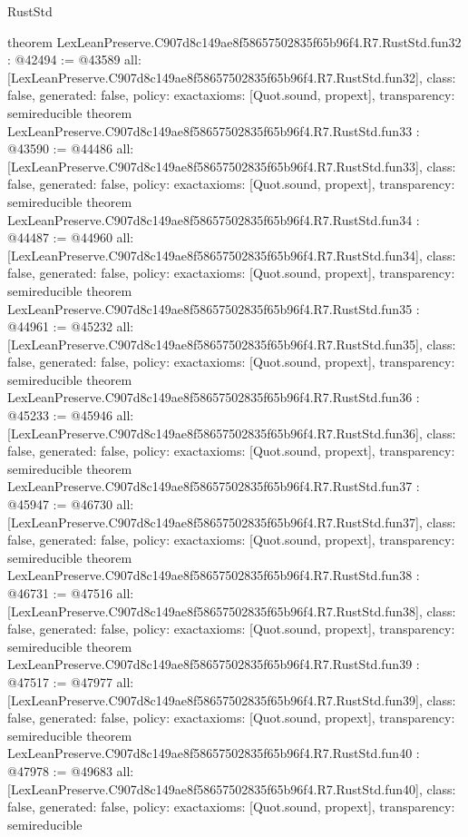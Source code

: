 \begin{lexlean}{RustStd}
\begin{coremodule}
{}
theorem LexLeanPreserve.C907d8c149ae8f58657502835f65b96f4.R7.RustStd.fun32 : @42494 := @43589 {
  all: [LexLeanPreserve.C907d8c149ae8f58657502835f65b96f4.R7.RustStd.fun32],
  class: false,
  generated: false,
  policy: exact{axioms: [Quot.sound, propext]},
  transparency: semireducible
}
theorem LexLeanPreserve.C907d8c149ae8f58657502835f65b96f4.R7.RustStd.fun33 : @43590 := @44486 {
  all: [LexLeanPreserve.C907d8c149ae8f58657502835f65b96f4.R7.RustStd.fun33],
  class: false,
  generated: false,
  policy: exact{axioms: [Quot.sound, propext]},
  transparency: semireducible
}
theorem LexLeanPreserve.C907d8c149ae8f58657502835f65b96f4.R7.RustStd.fun34 : @44487 := @44960 {
  all: [LexLeanPreserve.C907d8c149ae8f58657502835f65b96f4.R7.RustStd.fun34],
  class: false,
  generated: false,
  policy: exact{axioms: [Quot.sound, propext]},
  transparency: semireducible
}
theorem LexLeanPreserve.C907d8c149ae8f58657502835f65b96f4.R7.RustStd.fun35 : @44961 := @45232 {
  all: [LexLeanPreserve.C907d8c149ae8f58657502835f65b96f4.R7.RustStd.fun35],
  class: false,
  generated: false,
  policy: exact{axioms: [Quot.sound, propext]},
  transparency: semireducible
}
theorem LexLeanPreserve.C907d8c149ae8f58657502835f65b96f4.R7.RustStd.fun36 : @45233 := @45946 {
  all: [LexLeanPreserve.C907d8c149ae8f58657502835f65b96f4.R7.RustStd.fun36],
  class: false,
  generated: false,
  policy: exact{axioms: [Quot.sound, propext]},
  transparency: semireducible
}
theorem LexLeanPreserve.C907d8c149ae8f58657502835f65b96f4.R7.RustStd.fun37 : @45947 := @46730 {
  all: [LexLeanPreserve.C907d8c149ae8f58657502835f65b96f4.R7.RustStd.fun37],
  class: false,
  generated: false,
  policy: exact{axioms: [Quot.sound, propext]},
  transparency: semireducible
}
theorem LexLeanPreserve.C907d8c149ae8f58657502835f65b96f4.R7.RustStd.fun38 : @46731 := @47516 {
  all: [LexLeanPreserve.C907d8c149ae8f58657502835f65b96f4.R7.RustStd.fun38],
  class: false,
  generated: false,
  policy: exact{axioms: [Quot.sound, propext]},
  transparency: semireducible
}
theorem LexLeanPreserve.C907d8c149ae8f58657502835f65b96f4.R7.RustStd.fun39 : @47517 := @47977 {
  all: [LexLeanPreserve.C907d8c149ae8f58657502835f65b96f4.R7.RustStd.fun39],
  class: false,
  generated: false,
  policy: exact{axioms: [Quot.sound, propext]},
  transparency: semireducible
}
theorem LexLeanPreserve.C907d8c149ae8f58657502835f65b96f4.R7.RustStd.fun40 : @47978 := @49683 {
  all: [LexLeanPreserve.C907d8c149ae8f58657502835f65b96f4.R7.RustStd.fun40],
  class: false,
  generated: false,
  policy: exact{axioms: [Quot.sound, propext]},
  transparency: semireducible
}
\end{coremodule}
\end{lexlean}
